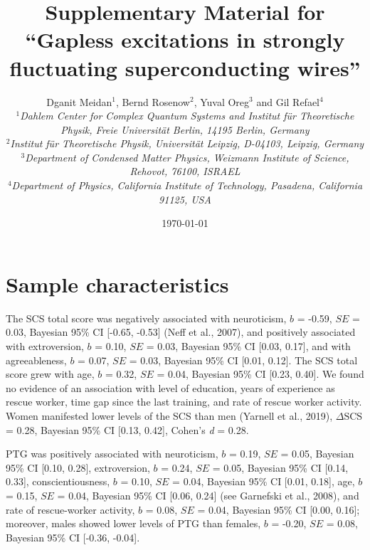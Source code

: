 \documentclass[aps,floatfix,prl]{revtex4}
\begin{document}
\title{Supplementary Material for\\ ``Gapless excitations in strongly fluctuating superconducting wires''}

\author{{ Dganit Meidan$^1$, Bernd Rosenow$^2$, Yuval Oreg$^3$ and Gil Refael$^4$}\\
{\small \em $^1 $Dahlem Center for Complex Quantum Systems and Institut
f\"{u}r Theoretische Physik, Freie Universit\"{a}t Berlin, 14195
Berlin, Germany\\
$^2$Institut f\"ur Theoretische Physik, Universit\"at Leipzig, D-04103, Leipzig, Germany\\
$^3$Department of Condensed Matter Physics, Weizmann Institute of Science, Rehovot, 76100, ISRAEL\\
$^4$Department of Physics, California Institute of Technology,
Pasadena, California 91125, USA}}

\date{\today}
\maketitle



\section{Sample characteristics}
\label{sample-characteristics}

The SCS total score was negatively associated with neuroticism, \(b\) =
-0.59, \(SE\) = 0.03, Bayesian 95\% CI {[}-0.65, -0.53{]} (Neff et al.,
2007), and positively associated with extroversion, \(b\) = 0.10, \(SE\)
= 0.03, Bayesian 95\% CI {[}0.03, 0.17{]}, and with agreeableness, \(b\)
= 0.07, \(SE\) = 0.03, Bayesian 95\% CI {[}0.01, 0.12{]}. The SCS total
score grew with age, \(b\) = 0.32, \(SE\) = 0.04, Bayesian 95\% CI
{[}0.23, 0.40{]}. We found no evidence of an association with level of
education, years of experience as rescue worker, time gap since the last
training, and rate of rescue worker activity. Women manifested lower
levels of the SCS than men (Yarnell et al., 2019), \(\Delta \text{SCS}\)
= 0.28, Bayesian 95\% CI {[}0.13, 0.42{]}, Cohen's \emph{d} = 0.28.

PTG was positively associated with neuroticism, \(b\) = 0.19, \(SE\) =
0.05, Bayesian 95\% CI {[}0.10, 0.28{]}, extroversion, \(b\) = 0.24,
\(SE\) = 0.05, Bayesian 95\% CI {[}0.14, 0.33{]}, conscientiousness,
\(b\) = 0.10, \(SE\) = 0.04, Bayesian 95\% CI {[}0.01, 0.18{]}, age,
\(b\) = 0.15, \(SE\) = 0.04, Bayesian 95\% CI {[}0.06, 0.24{]} (see
Garnefski et al., 2008), and rate of rescue-worker activity, \(b\) =
0.08, \(SE\) = 0.04, Bayesian 95\% CI {[}0.00, 0.16{]}; moreover, males
showed lower levels of PTG than females, \(b\) = -0.20, \(SE\) = 0.08,
Bayesian 95\% CI {[}-0.36, -0.04{]}.
\end{document}
